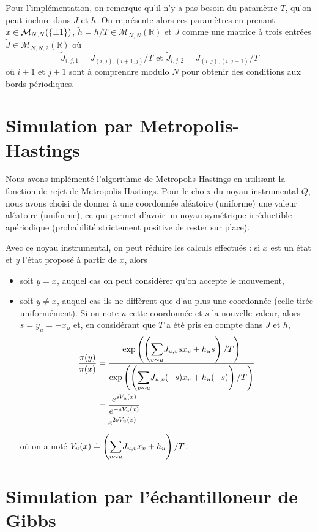 \documentclass[a4paper,11pt]{article}
\begin{document}
Pour l'implémentation, on remarque qu'il n'y a pas besoin du paramètre $T$, qu'on peut inclure dans $J$ et $h$. On représente alors ces paramètres en prenant $x \in \mathcal M_{N,N}(\left\lbrace \pm 1 \right\rbrace)$, $\tilde h = h/T \in \mathcal M_{N,N}(\mathbb R)$ et $J$ comme une matrice à trois entrées $\tilde J \in \mathcal M_{N,N,2}(\mathbb R)$ où
$$\tilde J_{i,j,1} = J_{(i,j),(i+1,j)}/T \text{ et } \tilde J_{i,j,2} = J_{(i,j),(i,j+1)}/T$$
où $i+1$ et $j+1$ sont à comprendre modulo $N$ pour obtenir des conditions aux bords périodiques.

\section{Simulation par Metropolis-Hastings}\label{sec:MH}

Nous avons implémenté l'algorithme de Metropolis-Hastings en utilisant la fonction de rejet de Metropolis-Hastings. Pour le choix du noyau instrumental $Q$, nous avons choisi de donner à une coordonnée aléatoire (uniforme) une valeur aléatoire (uniforme), ce qui permet d'avoir un noyau symétrique irréductible apériodique (probabilité strictement positive de rester sur place).

Avec ce noyau instrumental, on peut réduire les calculs effectués : si $x$ est un état et $y$ l'état proposé à partir de $x$, alors
\begin{itemize}
	\item soit $y = x$, auquel cas on peut considérer qu'on accepte le mouvement,
	\item soit $y \neq x$, auquel cas ils ne diffèrent que d'au plus une coordonnée (celle tirée uniformément). Si on note $u$ cette coordonnée et $s$ la nouvelle valeur, alors $s = y_u = - x_u$ et, en considérant que $T$ a été pris en compte dans $J$ et $h$,
	\begin{align*}
	\frac{\pi(y)}{\pi(x)}
	&= \frac{\exp \left(\left( \displaystyle{\sum_{v \sim u}^{}} J_{u,v} s x_{v} + h_{u} s \right) /T \right)}{\exp \left(\left( \displaystyle{\sum_{v \sim u}^{}} J_{u,v} (-s) x_{v} + h_{u} (-s) \right) /T \right)}\\
	&= \frac{e^{s V_u(x)}}{e^{-s V_u(x)}}\\
	&= e^{2 s V_u(x)}
	\end{align*}
	où on a noté $V_u(x) \doteq \left( \displaystyle{\sum_{v \sim u}^{}} J_{u,v} x_v + h_u \right) /T$.
\end{itemize}

\section{Simulation par l'échantilloneur de Gibbs}\label{sec:gibbs}
\end{document}
